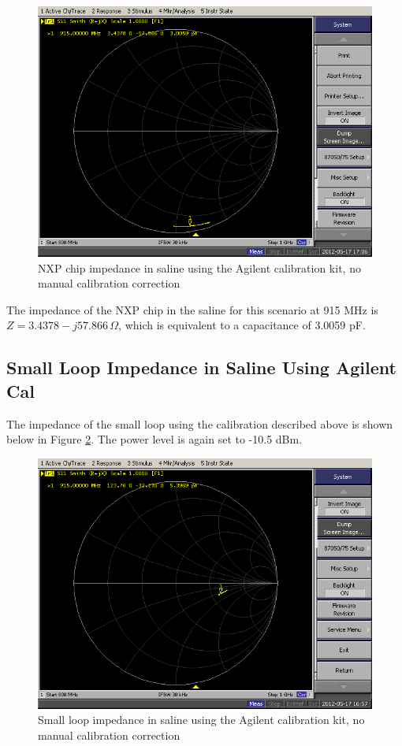 \documentclass[12pt,onecolumn,titlepage]{article}
\begin{document}
\begin{figure}[htbp]
   \centering
   \includegraphics[width=5in]{Pictures/31May2012/CHIP_SALINE_AGILENTCAL_NOCORR} %
   \caption{NXP chip impedance in saline using the Agilent calibration kit, no manual calibration correction}
   \label{fig:chip_agilentcal_saline}
\end{figure}

The impedance of the NXP chip in the saline for this scenario at 915 MHz is $Z=3.4378 - j57.866 \, \Omega$, which is equivalent to a capacitance of 3.0059 pF.


\subsection{Small Loop Impedance in Saline Using Agilent Cal}
\indent \indent The impedance of the small loop using the calibration described above is shown below in Figure \ref{fig:loop_agilentcal_saline}. The power level is again set to -10.5 dBm.

\begin{figure}[htbp]
   \centering
   \includegraphics[width=5in]{Pictures/31May2012/LOOP_SNGL_TURN_SALINE_AGILENTCAL_NOCORR} %
   \caption{Small loop impedance in saline using the Agilent calibration kit, no manual calibration correction}
   \label{fig:loop_agilentcal_saline}
\end{figure}
\end{document}
